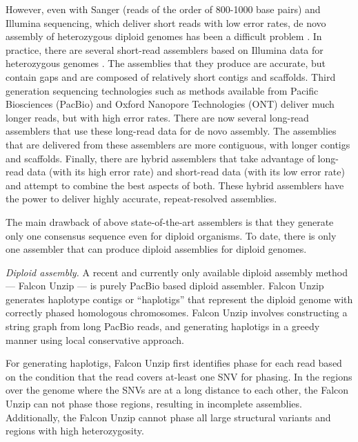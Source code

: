 However, even with Sanger (reads of the order of 800-1000 base pairs) and Illumina sequencing, which deliver short reads with low error rates, de novo assembly of heterozygous diploid genomes has been a difficult problem \citep{vinson2005assembly, levy2007diploid}.
In practice, there are several short-read assemblers based on Illumina data for heterozygous genomes \citep{kajitani2014efficient, pryszcz2016redundans, simpson2012efficient, bankevich2012spades, li2015fermikit}.
The assemblies that they produce are accurate, but contain gaps and are composed of relatively short contigs and scaffolds. 
Third generation sequencing technologies such as methods available from Pacific Biosciences (PacBio) and Oxford Nanopore Technologies (ONT) deliver much longer reads, but with high error rates.
There are now several long-read assemblers \citep{koren2017canu, vaser2017fast, xiao2016mecat, berlin2015assembling, chin2013nonhybrid, hunt2015circlator, lin2016assembly} that use these long-read data for de novo assembly.
The assemblies that are delivered from these assemblers are more contiguous, with longer contigs and scaffolds.
Finally, there are hybrid assemblers that take advantage of long-read data (with its high error rate) and short-read data (with its low error rate) \citep{bashir2012hybrid, antipov2015hybridspades, zimin2017hybrid} and attempt to combine the best aspects of both.
These hybrid assemblers have the power to deliver highly accurate, repeat-resolved assemblies.

The main drawback of above state-of-the-art assemblers is that they generate only one consensus sequence even for diploid organisms. To date, there is only one assembler that can produce diploid assemblies for diploid genomes.

\textit{Diploid assembly.} A recent and currently only available diploid assembly method --- Falcon Unzip \citep{chin2016phased} --- is purely PacBio based diploid assembler.
Falcon Unzip generates haplotype contigs or ``haplotigs'' that represent the diploid genome with correctly phased homologous chromosomes.
Falcon Unzip involves constructing a string graph from long PacBio reads, and generating haplotigs in a greedy manner using local conservative approach.


For generating haplotigs, Falcon Unzip first identifies phase for each read based on the condition that the read covers at-least one SNV for phasing.
In the regions over the genome where the SNVs are at a long distance to each other, the Falcon Unzip can not phase those regions, resulting in incomplete assemblies.
Additionally, the Falcon Unzip cannot phase all large structural variants and regions with high heterozygosity. 

